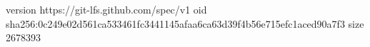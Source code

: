 version https://git-lfs.github.com/spec/v1
oid sha256:0c249e02d561ca533461fc3441145afaa6ca63d39f4b56e715efc1aced90a7f3
size 2678393
